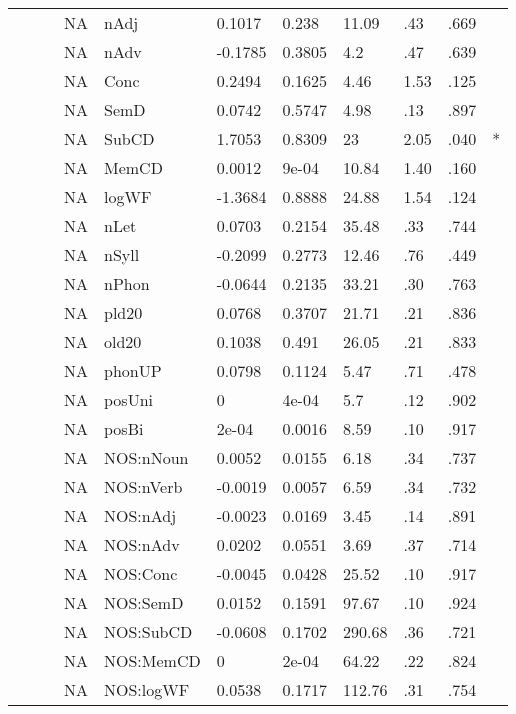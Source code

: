 \begin{table}[ht]
\begin{tabular}{lllllllllll}
   &  &  & NA & nAdj & 0.1017 & 0.238 & 11.09 & .43 & .669 &   \\ 
   &  &  & NA & nAdv & -0.1785 & 0.3805 & 4.2 & .47 & .639 &   \\ 
   &  &  & NA & Conc & 0.2494 & 0.1625 & 4.46 & 1.53 & .125 &   \\ 
   &  &  & NA & SemD & 0.0742 & 0.5747 & 4.98 & .13 & .897 &   \\ 
   &  &  & NA & SubCD & 1.7053 & 0.8309 & 23 & 2.05 & .040 & * \\ 
   &  &  & NA & MemCD & 0.0012 & 9e-04 & 10.84 & 1.40 & .160 &   \\ 
   &  &  & NA & logWF & -1.3684 & 0.8888 & 24.88 & 1.54 & .124 &   \\ 
   &  &  & NA & nLet & 0.0703 & 0.2154 & 35.48 & .33 & .744 &   \\ 
   &  &  & NA & nSyll & -0.2099 & 0.2773 & 12.46 & .76 & .449 &   \\ 
   &  &  & NA & nPhon & -0.0644 & 0.2135 & 33.21 & .30 & .763 &   \\ 
   &  &  & NA & pld20 & 0.0768 & 0.3707 & 21.71 & .21 & .836 &   \\ 
   &  &  & NA & old20 & 0.1038 & 0.491 & 26.05 & .21 & .833 &   \\ 
   &  &  & NA & phonUP & 0.0798 & 0.1124 & 5.47 & .71 & .478 &   \\ 
   &  &  & NA & posUni & 0 & 4e-04 & 5.7 & .12 & .902 &   \\ 
   &  &  & NA & posBi & 2e-04 & 0.0016 & 8.59 & .10 & .917 &   \\ 
   &  &  & NA & NOS:nNoun & 0.0052 & 0.0155 & 6.18 & .34 & .737 &   \\ 
   &  &  & NA & NOS:nVerb & -0.0019 & 0.0057 & 6.59 & .34 & .732 &   \\ 
   &  &  & NA & NOS:nAdj & -0.0023 & 0.0169 & 3.45 & .14 & .891 &   \\ 
   &  &  & NA & NOS:nAdv & 0.0202 & 0.0551 & 3.69 & .37 & .714 &   \\ 
   &  &  & NA & NOS:Conc & -0.0045 & 0.0428 & 25.52 & .10 & .917 &   \\ 
   &  &  & NA & NOS:SemD & 0.0152 & 0.1591 & 97.67 & .10 & .924 &   \\ 
   &  &  & NA & NOS:SubCD & -0.0608 & 0.1702 & 290.68 & .36 & .721 &   \\ 
   &  &  & NA & NOS:MemCD & 0 & 2e-04 & 64.22 & .22 & .824 &   \\ 
   &  &  & NA & NOS:logWF & 0.0538 & 0.1717 & 112.76 & .31 & .754 &   \\ 

\end{tabular}
\end{table}
